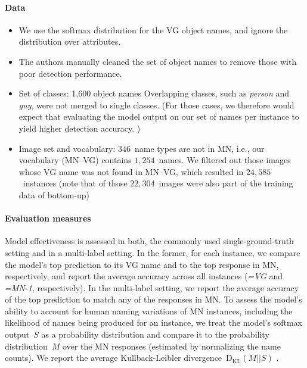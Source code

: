 \paragraph{Data}
\begin{itemize}
	\item We use the softmax distribution for the VG object names, and ignore the distribution over attributes. 
	\item The authors manually cleaned the set of object names to remove those with poor detection performance.
	\item Set of classes: 1,600 object names
	Overlapping classes, such as \textsl{person} and \textsl{guy}, were not merged to single classes. (For those cases, we therefore would expect that evaluating the model output on our set of names per instance to yield higher detection accuracy. )
	\item Image set and vocabulary: $346$~name types are not in MN, i.e., our vocabulary (MN--VG) contains $1,254$~names. 
	We filtered out those images whose VG name was not found in MN--VG, which resulted in $24,585$~instances (note that of those $22,304$~images were also part of the training data of bottom-up)
\end{itemize} 

\paragraph{Evaluation measures}
Model effectiveness is assessed in both, the commonly used single-ground-truth setting and in a multi-label setting. 
In the former, for each instance, we compare the model's top prediction to its VG name and to the top response in MN, respectively, and report the average accuracy across all instances (\textit{=VG} and \textit{=MN-1}, respectively).
In the multi-label setting, we report the average accuracy of the top prediction to match any of the responses in MN. 
To assess the model's ability to account for human naming variations of MN instances, including the likelihood of names being produced for an instance, we treat the model's softmax output~$S$ as a probability distribution and compare it to the probability distribution~$M$ over the MN responses (estimated by normalizing the name counts). 
We report the average Kullback-Leibler divergence~$\mathrm{D_{KL}}(M||S)$ \cite{kullback1951information}. 

\iffalse
\textsl{top}: the model's top prediction
\begin{itemize}
	\item \textbf{=VG} The average model accuracy of \textsl{top} on the VG names
	\item \textbf{=MN-1} The average model accuracy of \textsl{top} on the top response in ManyNames
	\item \textbf{$\in$MN} The average model accuracy of \textsl{top} to match any name of the responses in ManyNames
	\item \textbf{KL} The average Kullback-Leibler divergence~$\mathrm{D_{KL}}(M||S)$ of the model's softmax output~$S$ and the  probability distribution~$M$ over ManyNames, estimated by normalizing the name counts per instance
\end{itemize}
\fi

